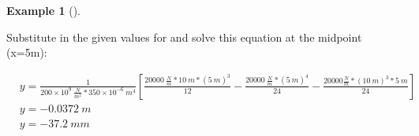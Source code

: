 \documentclass[
  letterpaper,
  DIV=11,
  numbers=noendperiod]{scrreprt}
\theoremstyle{definition}
\newtheorem{example}{Example}[chapter]
\theoremstyle{remark}
\begin{document}
\begin{tcolorbox}
\begin{example}[]
\begin{tcolorbox}
Substitute in the given values for and solve this equation at the
midpoint (x=5m):

\[
\begin{aligned} & y=\frac{1}{200 \times 10^9~\frac{N}{m^2}*350 \times 10^{-6}{~m}^4}\left[\frac{20000~\frac{N}{m}*10{~m}*(5{~m})^3}{12}-\frac{20000~\frac{N}{m}*(5{~m})^4}{24}-\frac{20000\frac{N}{m}*(10~{m})^3*5{~m}}{24}\right] \\
& y=-0.0372{~m} \\
& y=-37.2{~mm}
\end{aligned}
\]

\end{tcolorbox}

\end{example}

\end{tcolorbox}
\end{document}
